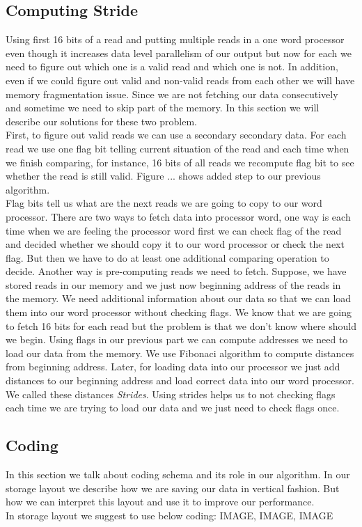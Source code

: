 \subsection{Computing Stride}
Using first 16 bits of a read and putting multiple reads in a one word processor even though it increases data level parallelism of our output but now for each we need to figure out which one is a valid read and which one is not. In addition, even if we could figure out valid and non-valid reads from each other we will have memory fragmentation issue. Since we are not fetching our data consecutively and sometime we need to skip part of the memory. In this section we will describe our solutions for these two problem.\\
First, to figure out valid reads we can use a secondary secondary data. For each read we use one flag bit telling current situation of the read and each time when we finish comparing, for instance, 16 bits of all reads we recompute flag bit to see whether the read is still valid. Figure ... shows added step to our previous algorithm.\\

Flag bits tell us what are the next reads we are going to copy to our word processor. There are two ways to fetch data into processor word, one way is each time when we are feeling the processor word first we can check flag of the read and decided whether we should copy it to our word processor or check the next flag. But then we have to do at least one additional comparing operation to decide. Another way is pre-computing reads we need to fetch. Suppose, we have stored reads in our memory and we just now beginning address of the reads in the memory. We need additional information about our data so that we can load them into our word processor without checking flags. We know that we are going to fetch 16 bits for each read but the problem is that we don't know where should we begin. Using flags in our previous part we can compute addresses we need to load our data from the memory. We use Fibonaci algorithm to compute distances from beginning address. Later, for loading data into our processor we just add distances to our beginning address and load correct data into our word processor. We called these distances \emph{Strides}. Using strides helps us to not checking flags each time we are trying to load our data and we just need to check flags once.

\subsection{Coding}
In this section we talk about coding schema and its role in our algorithm. In our storage layout we describe how we are saving our data in vertical fashion. But how we can interpret this layout and use it to improve our performance.\\
In storage layout we suggest to use below coding:
 IMAGE, IMAGE, IMAGE
 

